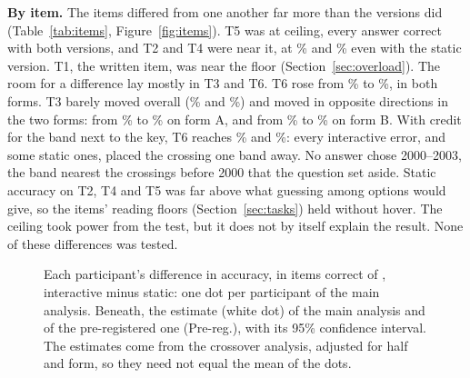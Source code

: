 \documentclass[10pt,twocolumn]{article}
\begin{document}
\textbf{By item.} The items differed from one another far more than the versions did (Table~\ref{tab:items}, Figure~\ref{fig:items}). T5 was at ceiling, every answer correct with both versions, and T2 and T4 were near it, at \% and \% even with the static version. T1, the written item, was near the floor (Section~\ref{sec:overload}). The room for a difference lay mostly in T3 and T6. T6 rose from \% to \%, in both forms. T3 barely moved overall (\% and \%) and moved in opposite directions in the two forms: from \% to \% on form A, and from \% to \% on form B. With credit for the band next to the key, T6 reaches \% and \%: every interactive error, and some static ones, placed the crossing one band away. No answer chose 2000--2003, the band nearest the crossings before 2000 that the question set aside. Static accuracy on T2, T4 and T5 was far above what guessing among  options would give, so the items' reading floors (Section~\ref{sec:tasks}) held without hover. The ceiling took power from the test, but it does not by itself explain the result. None of these differences was tested.

\begin{table}[t]
    \centering
    \footnotesize
    
    \caption{
        The three main tests, which Holm's correction treats as one family, in the main analysis and as pre-registered. Each estimate is interactive minus static, from the crossover analysis adjusted for half and form, with its 95\% confidence interval; accuracy is also given in items, of . Only these three tests can be called significant, at $\alpha = \stat{design/alpha}$ after Holm's correction.
    }
    \label{tab:tests}
\end{table}

\begin{figure}[t]
    \centering
    
    \caption{
        Each participant's difference in accuracy, in items correct of , interactive minus static: one dot per participant of the main analysis. Beneath, the estimate (white dot) of the main analysis and of the pre-registered one (Pre-reg.), with its 95\% confidence interval. The estimates come from the crossover analysis, adjusted for half and form, so they need not equal the mean of the dots.
    }
    \label{fig:accuracy}
\end{figure}
\end{document}

